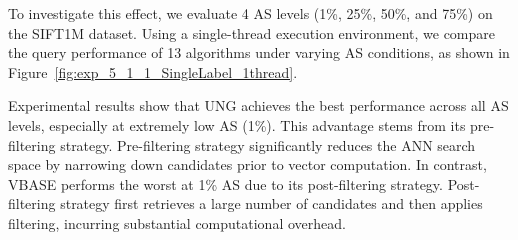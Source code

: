 \documentclass[sigconf, nonacm]{acmart}
\begin{document}
	To investigate this effect, we evaluate 4 AS levels (1\%, 25\%, 50\%, and 75\%) on the SIFT1M dataset. Using a single-thread execution environment, we compare the query performance of 13 algorithms under varying AS conditions, as shown in Figure~\ref{fig:exp_5_1_1_SingleLabel_1thread}.
	
	Experimental results show that UNG achieves the best performance across all AS levels, especially at extremely low AS (1\%). 
	This advantage stems from its pre-filtering strategy. Pre-filtering strategy significantly reduces the ANN search space by narrowing down candidates prior to vector computation. In contrast, VBASE performs the worst at 1\% AS due to its post-filtering strategy. Post-filtering strategy first retrieves a large number of candidates and then applies filtering, incurring substantial computational overhead.
	
	
	
\end{document}
